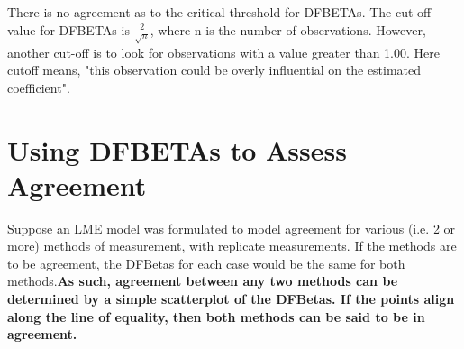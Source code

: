 \documentclass[12pt, a4paper]{report}
\theoremstyle{plain}
\theoremstyle{definition}
\theoremstyle{remark}
\begin{document}




There is no agreement as to the critical threshold for DFBETAs. The cut-off value for DFBETAs is $\frac{2}{\sqrt{n}}$, where n is the number of observations. 
However, another cut-off is to look for observations with a value greater than 1.00. Here cutoff means, 
"this observation could be overly influential on the estimated coefficient".

\section*{ Using DFBETAs to Assess Agreement}
Suppose an LME model was formulated to model agreement for various (i.e. 2 or more) methods of measurement, with replicate measurements. If the methods are to be agreement, the DFBetas for each case would be the same for both methods.\textbf{As such, agreement between any two methods can be determined by a simple scatterplot of the DFBetas. If the points align along the line of equality, then both methods can be said to be in agreement.}
\end{document}
